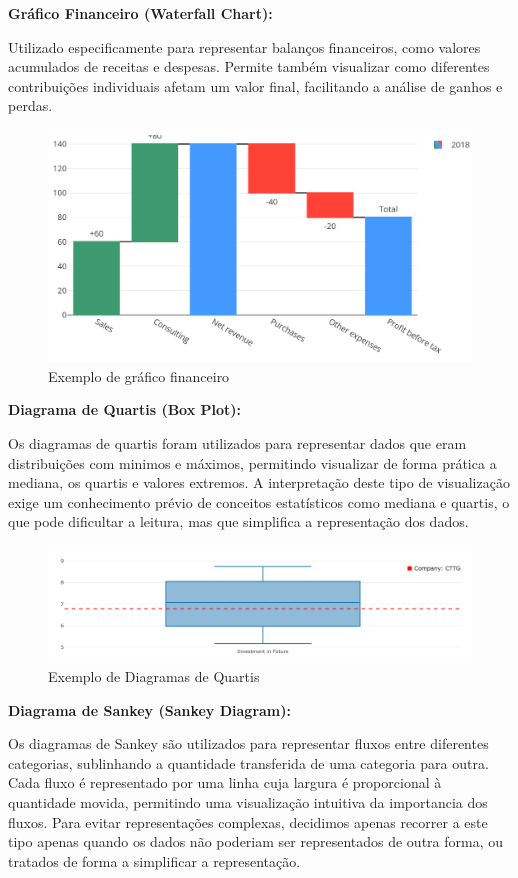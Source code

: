\textbf{Gráfico Financeiro (Waterfall Chart):}  

Utilizado especificamente para representar balanços financeiros, como valores acumulados de receitas e despesas. Permite também visualizar como diferentes contribuições individuais afetam um valor final, facilitando a análise de ganhos e perdas.

\begin{figure}[H]
    \centering
    \includegraphics[max width=12cm, keepaspectratio]{./img/waterfall}
    \caption{Exemplo de gráfico financeiro}
\end{figure}
\noindent

\textbf{Diagrama de Quartis (Box Plot):}

Os diagramas de quartis foram utilizados para representar dados que eram distribuições com minimos e máximos, permitindo visualizar de forma prática a mediana, os quartis e valores extremos.  A interpretação deste tipo de visualização exige um conhecimento prévio de conceitos estatísticos como mediana e quartis, o que pode dificultar a leitura, mas que simplifica a representação dos dados.

\begin{figure}[H]
    \centering
    \includegraphics[max width=12cm, keepaspectratio]{./img/box}
    \caption{Exemplo de Diagramas de Quartis}
\end{figure}
\noindent

\textbf{Diagrama de Sankey (Sankey Diagram):}

Os diagramas de Sankey são utilizados para representar fluxos entre diferentes categorias, sublinhando a quantidade transferida de uma categoria para outra. Cada fluxo é representado por uma linha cuja largura é proporcional à quantidade movida, permitindo uma visualização intuitiva da importancia dos fluxos. Para evitar representações complexas, decidimos apenas recorrer a este tipo apenas quando os dados não poderiam ser representados de outra forma, ou tratados de forma a simplificar a representação.

